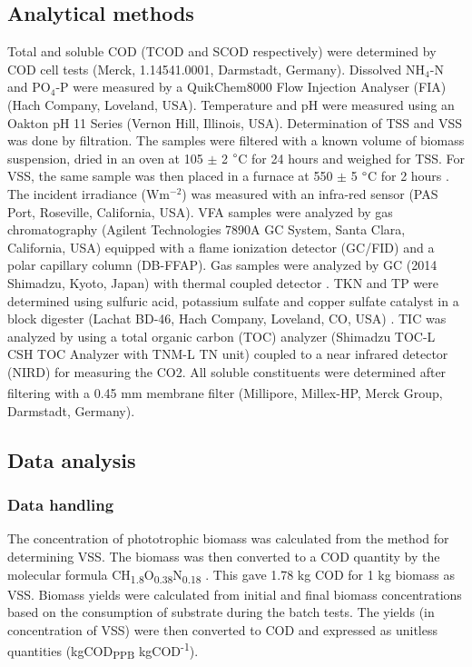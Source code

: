 \subsection{Analytical methods}
Total and soluble COD (TCOD and SCOD respectively) were determined by COD cell tests (Merck, 1.14541.0001, Darmstadt, Germany). Dissolved $\mathrm{NH_4\mbox{-}N}$ and $\mathrm{PO_4\mbox{-}P}$ were measured by a QuikChem8000 Flow Injection Analyser (FIA) (Hach Company, Loveland, USA). Temperature and pH were measured using an Oakton pH 11 Series (Vernon Hill, Illinois, USA). Determination of TSS and VSS was done by filtration. The samples were filtered with a known volume of biomass suspension, dried in an oven at 105 $\pm$ 2 $\degree$C for 24 hours and weighed for TSS. For VSS, the same sample was then placed in a furnace at 550 $\pm$ 5 $\degree$C for 2 hours \cite{americanpublichealthassociation1998}. The incident irradiance ($\mathrm{Wm^{-2}}$) was measured with an infra-red sensor (PAS Port\texttrademark, Roseville, California, USA). VFA samples were analyzed by gas chromatography (Agilent Technologies 7890A GC System, Santa Clara, California, USA) equipped with a flame ionization detector (GC/FID) and a polar capillary column (DB-FFAP). Gas samples were analyzed by GC (2014 Shimadzu, Kyoto, Japan) with thermal coupled detector \cite{tait2009}. TKN and TP were determined using sulfuric acid, potassium sulfate and copper sulfate catalyst in a block digester (Lachat BD-46, Hach Company, Loveland, CO, USA) \cite{patton1992}. TIC was analyzed by using a total organic carbon (TOC) analyzer (Shimadzu TOC-L CSH TOC Analyzer with TNM-L TN unit) coupled to a near infrared detector (NIRD) for measuring the CO2. All soluble constituents were determined after filtering with a 0.45 mm membrane filter (Millipore, Millex\textsuperscript{\textregistered}-HP, Merck Group, Darmstadt, Germany).

\subsection{Data analysis}
\subsubsection{Data handling}
The concentration of phototrophic biomass was calculated from the method for determining VSS. The biomass was then converted to a COD quantity by the molecular formula CH\textsubscript{1.8}O\textsubscript{0.38}N\textsubscript{0.18} \cite{mckinlay2010}. This gave 1.78 kg COD for 1 kg biomass as VSS. Biomass yields were calculated from initial and final biomass concentrations based on the consumption of substrate during the batch tests. The yields (in concentration of VSS) were then converted to COD and expressed as unitless quantities (kgCOD\textsubscript{PPB} kgCOD\textsuperscript{-1}). 

